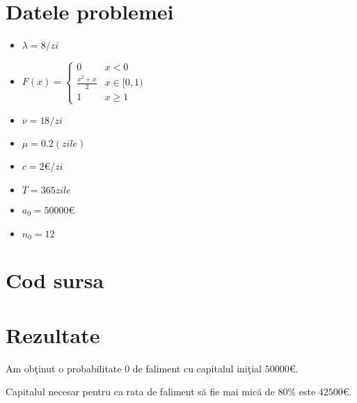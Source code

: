 \documentclass{article}
\begin{document}
	\section{Datele problemei}
	\begin{itemize}
		\item $\lambda=8/zi$
		\item $F(x) =
			\begin{cases}
				0 & x<0\\
				\frac{x^2+x}{2} & x \in [0,1) \\
				1 & x\geq1
			\end{cases}
			$
		\item $\nu = 18/zi$
		\item $\mu = 0.2 (zile)$
		\item $c = 2 $\euro$/zi$
		\item $T = 365 zile$
		\item $a_0 = 50000$\euro
		\item $n_0=12$
	\end{itemize}
	\section{Cod sursa}
	
	
	\section{Rezultate}
	Am ob\c{t}inut o probabilitate 0 de faliment cu capitalul ini\c{t}ial $50000$\euro.
	
	Capitalul necesar pentru ca rata de faliment s\u{a} fie mai mic\u{a} de 80\% este $42500$\euro.
\end{document}
